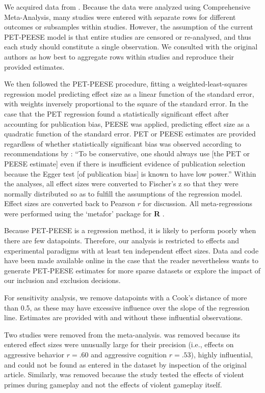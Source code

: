 \documentclass[man]{apa6}
\begin{document}
We acquired data from \citet{Anderson:etal:2010}. Because the data were analyzed using Comprehensive Meta-Analysis, many studies were entered with separate rows for different outcomes or subsamples within studies. However, the assumption of the current PET-PEESE model is that entire studies are censored or re-analysed, and thus each study should constitute a single observation. We consulted with the original authors as how best to aggregate rows within studies and reproduce their provided estimates.

We then followed the PET-PEESE procedure, fitting a weighted-least-squares regression model predicting effect size as a linear function of the standard error, with weights inversely proportional to the square of the standard error. In the case that the PET regression found a statistically significant effect after accounting for publication bias, PEESE was applied, predicting effect size as a quadratic function of the standard error. PET or PEESE estimates are provided regardless of whether statistically significant bias was observed according to recommendations by \citet[p. 20-21]{Stanley:Doucouliagos:2013}: ``To be conservative, one should always use [the PET or PEESE estimate] even if there is insufficient evidence of publication selection because the Egger test [of publication bias] is known to have low power.'' Within the analyses, all effect sizes were converted to Fischer's z so that they were normally distributed so as to fulfill the assumptions of the regression model. Effect sizes are converted back to Pearson $r$ for discussion. All meta-regressions were performed using the `metafor' package for {\bf R} \citep{Viechtbauer:2010}.

Because PET-PEESE is a regression method, it is likely to perform poorly when there are few datapoints. Therefore, our analysis is restricted to effects and experimental paradigms with at least ten independent effect sizes. %
Data and code have been made available online in the case that the reader nevertheless wants to generate PET-PEESE estimates for more sparse datasets or explore the impact of our inclusion and exclusion decisions.

For sensitivity analysis, we remove datapoints with a Cook's distance of more than 0.5, as these may have excessive influence over the slope of the regression line. Estimates are provided with and without these influential observations.

Two studies were removed from the meta-analysis. \citet[study 1]{Matsuzaki:etal:2006} was removed because its entered effect sizes were unusually large for their precision (i.e., effects on aggressive behavior $r = .60$ and aggressive cognition $r = .53$), highly influential, and could not be found as entered in the \citet{Anderson:etal:2010} dataset by inspection of the original article. Similarly, \citet{Panee:Ballard:2002} was removed because the study tested the effects of violent primes during gameplay and not the effects of violent gameplay itself. %
\end{document}
